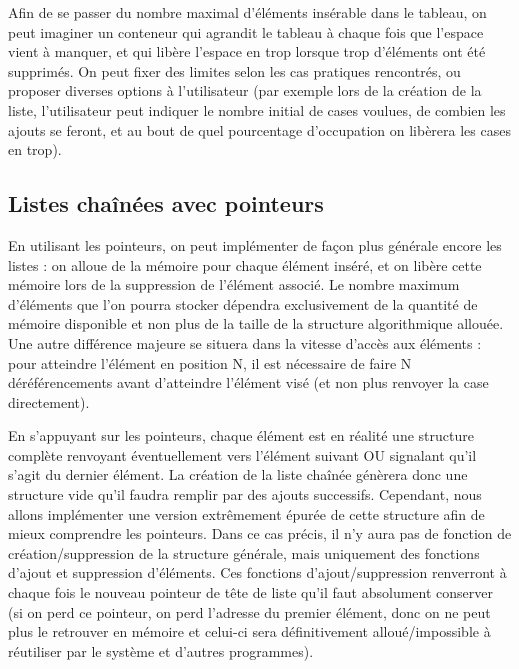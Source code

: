 \documentclass[11pt,a4paper]{article}
\begin{document}
\bigskip

Afin de se passer du nombre maximal d'éléments insérable dans le tableau, on peut imaginer un conteneur qui agrandit le tableau à chaque fois que l'espace vient à manquer, et qui libère l'espace en trop lorsque trop d'éléments ont été supprimés.
On peut fixer des limites selon les cas pratiques rencontrés, ou proposer diverses options à l'utilisateur (par exemple lors de la création de la liste, l'utilisateur peut indiquer le nombre initial de cases voulues, de combien les ajouts se feront, et au bout de quel pourcentage d'occupation on libèrera les cases en trop).

\bigskip



\bigskip


\subsection{Listes chaînées avec pointeurs}

\bigskip

En utilisant les pointeurs, on peut implémenter de façon plus générale encore les listes : on alloue de la mémoire pour chaque élément inséré, et on libère cette mémoire lors de la suppression de l'élément associé.
Le nombre maximum d'éléments que l'on pourra stocker dépendra exclusivement de la quantité de mémoire disponible et non plus de la taille de la structure algorithmique allouée.
Une autre différence majeure se situera dans la vitesse d'accès aux éléments : pour atteindre l'élément en position N, il est nécessaire de faire N déréférencements avant d'atteindre l'élément visé (et non plus renvoyer la case directement).

\medskip

En s'appuyant sur les pointeurs, chaque élément est en réalité une structure complète renvoyant éventuellement vers l'élément suivant OU signalant qu'il s'agit du dernier élément.
La création de la liste chaînée génèrera donc une structure vide qu'il faudra remplir par des ajouts successifs.
Cependant, nous allons implémenter une version extrêmement épurée de cette structure afin de mieux comprendre les pointeurs.
Dans ce cas précis, il n'y aura pas de fonction de création/suppression de la structure générale, mais uniquement des fonctions d'ajout et suppression d'éléments.
Ces fonctions d'ajout/suppression renverront à chaque fois le nouveau pointeur de tête de liste qu'il faut absolument conserver (si on perd ce pointeur, on perd l'adresse du premier élément, donc on ne peut plus le retrouver en mémoire et celui-ci sera définitivement alloué/impossible à réutiliser par le système et d'autres programmes).
\end{document}

